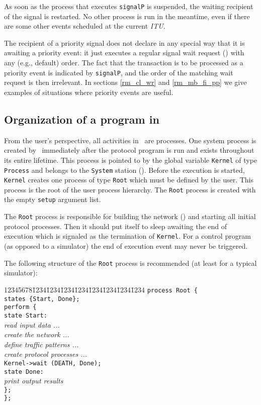As soon as the process that executes {\tt signalP} is suspended, the
waiting recipient of the signal is restarted.
No other process is run
in the meantime, even if there are some other events scheduled at
the current {\em ITU}.

The recipient of a priority signal
does not declare in any special way that it is awaiting a priority event:
it just executes a regular signal wait request () with
any (e.g., default) order.
The fact that the transaction is to be processed as a
priority event is indicated by {\tt signalP}, and the order of the matching
wait request is then irrelevant.
In sections \ref{rm_cl_wr} and \ref{rm_mb_fi_pp} we give examples of situations
where priority events are useful.

\subsection{Organization of a program in \smurph}
\label{rm_pr_or}

From the user's perspective, all activities in \smurph\ are processes.
One system process is created by \smurph\ immediately
after the protocol program is run
and exists throughout its entire lifetime.
This process is pointed to by the global variable {\tt Kernel} of type
{\tt Process} and belongs to the {\tt System} station ().
Before the execution is started, {\tt Kernel} creates one process of type
{\tt Root} which must be defined by the user.
This process is the root of the user process hierarchy.
The {\tt Root} process is created with the empty {\tt setup} argument list.

The {\tt Root} process is responsible for building the network ()
and starting all initial protocol processes.
Then it should put itself to sleep awaiting the end of execution which
is signaled as the termination of {\tt Kernel}.
For a control program (as opposed to a simulator) the end of execution event
may never be triggered.

The following structure of the {\tt Root} process is recommended (at least
for a typical simulator):
{\tt\begin{tabbing}
12345678\=1234\=1234\=1234\=1234\=1234\=1234\=1234\=1234\kill
\> {\tt process Root \{} \\
\> \> {\tt states \{Start, Done\};} \\
\> \> {\tt perform \{} \\
\> \> \> {\tt state Start:} \\
\> \> \> \> {\em read input data ...} \\
\> \> \> \> {\em create the network ...} \\
\> \> \> \> {\em define traffic patterns ...} \\
\> \> \> \> {\em create protocol processes ...} \\
\> \> \> \> {\tt Kernel->wait (DEATH, Done);} \\
\> \> \> {\tt state Done:} \\
\> \> \> \> {\em print output results} \\
\> \> {\tt \};} \\
\> {\tt \};}
\end{tabbing}}


